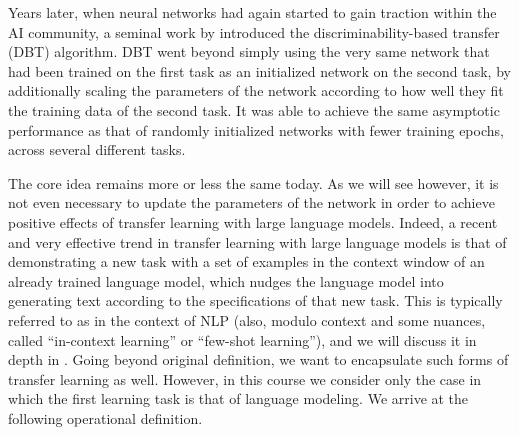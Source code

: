 Years later, when neural networks had again started to gain traction within the AI community, a seminal work by \citet{pratt1992} introduced the discriminability-based transfer (DBT) algorithm. DBT went beyond simply using the very same network that had been trained on the first task as an initialized network on the second task, 
by additionally scaling the parameters of the network according to how well they fit the training data of the second task. It was able to achieve the same asymptotic performance as that of randomly initialized networks with fewer training epochs, across several different tasks. 

The core idea remains more or less the same today. As we will see however, it is not even necessary to update the parameters of the network in order to achieve positive effects of transfer learning with large language models. Indeed, a recent and very effective trend in transfer learning with large language models is that of demonstrating a new task with a set of examples in the context window of an already trained language model, which nudges the language model into generating text according to the specifications of that new task. This is typically referred to as   in the context of NLP (also, modulo context and some nuances, called ``in-context learning'' or ``few-shot learning''), and we will discuss it in depth in . Going beyond  original definition, we want to encapsulate such forms of transfer learning as well. However, in this course we consider only the case in which the first learning task is that of language modeling. We arrive at the following operational definition.
\clearpage

